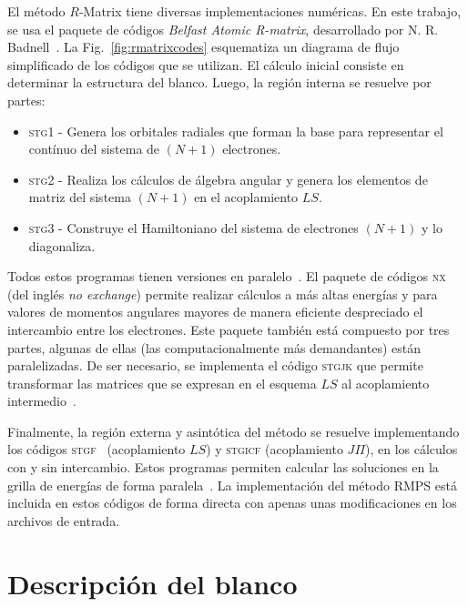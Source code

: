 El método $R$-Matrix tiene diversas implementaciones numéricas. En este 
trabajo, se usa el paquete de códigos \textit{Belfast Atomic R-matrix}, 
desarrollado por N. R. Badnell~\cite{QUB-Badnell}. 
La Fig.~\ref{fig:rmatrixcodes} esquematiza un diagrama de flujo 
simplificado de los códigos que se utilizan. El cálculo inicial consiste 
en determinar la estructura del blanco. Luego, la región interna se 
resuelve por partes: 
\begin{itemize}
\item \textsc{stg1} - Genera los orbitales radiales que forman la base
para representar el contínuo del sistema de $(N+1)$ electrones.
\item \textsc{stg2} - Realiza los cálculos de álgebra angular y genera 
los elementos de matriz del sistema $(N+1)$ en el acoplamiento $LS$.
\item \textsc{stg3} - Construye el Hamiltoniano del sistema de 
electrones $(N+1)$ y lo diagonaliza.
\end{itemize}
Todos estos programas tienen versiones en paralelo~\cite{Mitnik:99,
Mitnik:01,Ballance:04}. 
El paquete de códigos \textsc{nx}~\cite{Burke:92} (del inglés 
\textit{no exchange}) permite realizar cálculos a más altas energías y 
para valores de momentos angulares mayores de manera eficiente 
despreciado el intercambio entre los electrones. Este paquete también 
está compuesto por tres partes, algunas de ellas (las computacionalmente 
más demandantes) están paralelizadas. De ser necesario, se implementa el 
código \textsc{stgjk} que permite transformar las matrices que se 
expresan en el esquema $LS$ al acoplamiento intermedio~\cite{Griffin:98}.

Finalmente, la región externa y asintótica del método se resuelve 
implementando los códigos \textsc{stgf}~\cite{Seaton:85} (acoplamiento 
$LS$) y \textsc{stgicf} (acoplamiento $J\Pi$), en los cálculos con y sin 
intercambio. Estos programas permiten calcular las soluciones en la 
grilla de energías de forma 
paralela~\cite{Mitnik:99,FernandezMenchero:20}. La implementación del 
método RMPS está incluida en estos códigos de forma directa con apenas 
unas modificaciones en los archivos de entrada.

\section{Descripción del blanco}
\label{sec:target-rmatrix}

